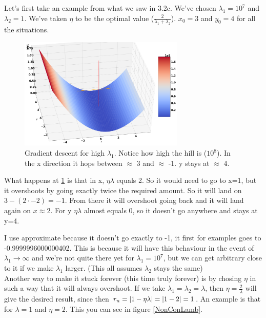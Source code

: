 \documentclass[a4paper]{article}
\begin{document}
Let's first take an example from what we saw in 3.2c. We've chosen $\lambda_1 = 10^7$ and $\lambda_2 = 1$. We've taken $\eta$ to be the optimal value ($\frac{2}{\lambda_1 + \lambda_2}$). $x_0 = 3$ and $y_0 = 4$ for all the situations.


\begin{figure}[H]
\includegraphics[width=0.7\textwidth]{Images/HighLamb.png}
\caption{Gradient descent for high $\lambda_1$. Notice how high the hill is ($10^8$). In the x direction it hops between $\approx$ 3 and $\approx$ -1. y stays at $\approx$ 4.}
\label{mountain}
\end{figure}

What happens at \ref{mountain} is that in x, $\eta \lambda$ equals 2. So it would need to go to x=1, but it overshoots by going exactly twice the required amount. So it will land on $3 - (2\cdot -2) = -1$.
From there it will overshoot going back and it will land again on $x\approx 2$. For y $\eta \lambda$ almost equals 0, so it doesn't go anywhere and stays at y=4.

I use approximate because it doesn't go exactly to -1, it first for examples goes to -0.9999996000000402. This is because it will have this behaviour in the event of $\lambda_1 \rightarrow \infty$ and we're not quite there yet for $\lambda_1 = 10^7$, but we can get arbitrary close to it if we make $\lambda_1$ larger. (This all assumes $\lambda_2$ stays the same)
\\

Another way to make it stuck forever (this time truly forever) is by chosing $\eta$ in such a way that it will always overshoot. If we take $\lambda_1 = \lambda_2 = \lambda$, then $\eta = \frac{2}{\lambda}$ will give the desired result, since then $r_n = \abs{1-\eta \lambda} = \abs{1 - 2} = 1$. An example is that for $\lambda = 1$ and $\eta = 2$. This you can see in figure \ref{NonConLamb}.
\end{document}
